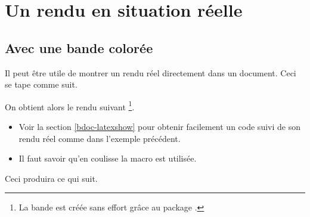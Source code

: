 

\usepackage[lang = french]{../main/main}
\usepackage{../macroenv/macroenv}
\usepackage{../listing/listing}
\usepackage{../rem-exa/rem-exa}


\usepackage{showcase}




\section{Un rendu en situation réelle}

\subsection{Avec une bande colorée}

\begin{bdocexa} 
    Il peut être utile de montrer un rendu réel directement dans un document.
    Ceci se tape comme suit.
    
    
	On obtient alors le rendu suivant
	\footnote{
    	La bande est créée sans effort grâce au package .
	}.

	\medskip
	
	
\end{bdocexa}


\begin{bdocrem}
	\leavevmode
	
	\begin{itemize}
	    \item Voir la section \ref{bdoc-latexshow} pour obtenir facilement un code suivi de son rendu réel comme dans l'exemple précédent.
	    
	    \item Il faut savoir qu'en coulisse la macro  est utilisée.
	\end{itemize}

    \begin{bdoclatex}[std]
	\end{bdoclatex}
\end{bdocrem}




\begin{bdocexa}
	\leavevmode


	Ceci produira ce qui suit.

	\medskip
	
	
\end{bdocexa}


